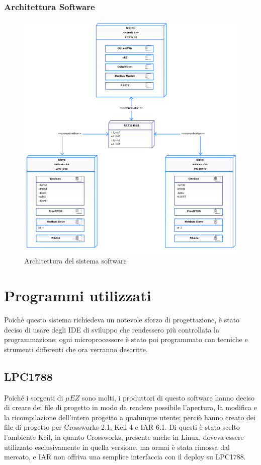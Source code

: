 \documentclass[a4paper,titlepage]{book}
\begin{document}
\subsection{Architettura Software}
\begin{figure}[!ht]
\centering
\includegraphics[scale=0.4]{deploy.png}
\caption{Architettura del sistema software}

\end{figure}


\chapter{Programmi utilizzati}

Poichè questo sistema richiedeva un notevole sforzo di progettazione, è stato deciso di usare degli IDE di sviluppo che rendessero più controllata la programmazione; ogni microprocessore è stato poi programmato con tecniche e strumenti differenti che ora verranno descritte. 

\section{LPC1788}

Poiché i sorgenti di $\mu EZ$ sono molti, i produttori di questo software hanno deciso di creare dei file di progetto in modo da rendere possibile l'apertura, la modifica e la ricompilazione dell'intero progetto a qualunque utente; perciò hanno creato dei file di progetto per Crossworks 2.1, Keil 4 e IAR 6.1. Di questi è stato scelto l'ambiente Keil, in quanto Crossworks, presente anche in Linux, doveva essere utilizzato esclusivamente in quella versione, ma ormai è stata rimossa dal mercato, e IAR non offriva una semplice interfaccia con il deploy su LPC1788.
\end{document}
